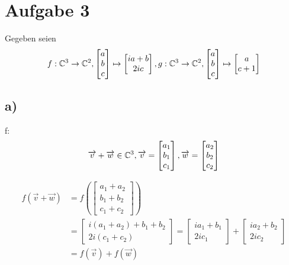 \documentclass[a4paper, 11pt]{article}
\begin{document}
\section{Aufgabe 3}
\label{sec:orgc6b698c}
Gegeben seien
$$f: \mathbb{C}^3 \rightarrow \mathbb{C}^2, \begin{bmatrix} a \\ b \\ c\end{bmatrix} \mapsto \begin{bmatrix} ia + b \\ 2ic\end{bmatrix}, \\
g: \mathbb{C}^3 \rightarrow \mathbb{C}^2, \begin{bmatrix} a \\ b \\ c\end{bmatrix} \mapsto \begin{bmatrix} a \\ c + 1\end{bmatrix}$$

\subsection{a)}
\label{sec:org38f0458}
f:
$$\overrightarrow{v} + \overrightarrow{w} \in \mathbb{C}^3, \overrightarrow{v} =   \begin{bmatrix} a_1 \\ b_ 1\\ c_1\end{bmatrix}, \\
\overrightarrow{w} = \begin{bmatrix} a_2 \\ b_2 \\ c_2\end{bmatrix}$$

\begin{align*}
    f(\overrightarrow{v} + \overrightarrow{w}) &= f \left( \begin{bmatrix} a_1 + a_2 \\ b_ 1 + b_2\\ c_1 + c_2\end{bmatrix} \right) \\
    &= \begin{bmatrix} i(a_1 + a_2) + b_1 + b_2 \\ 2i(c_ 1 + c_2)\end{bmatrix} =
    \begin{bmatrix} ia_1 + b_1 \\ 2ic_1 \end{bmatrix} + \begin{bmatrix} ia_2 + b_2 \\ 2ic_2 \end{bmatrix} \\
    &= f(\overrightarrow{v}) + f(\overrightarrow{w})
\end{align*}
\end{document}
